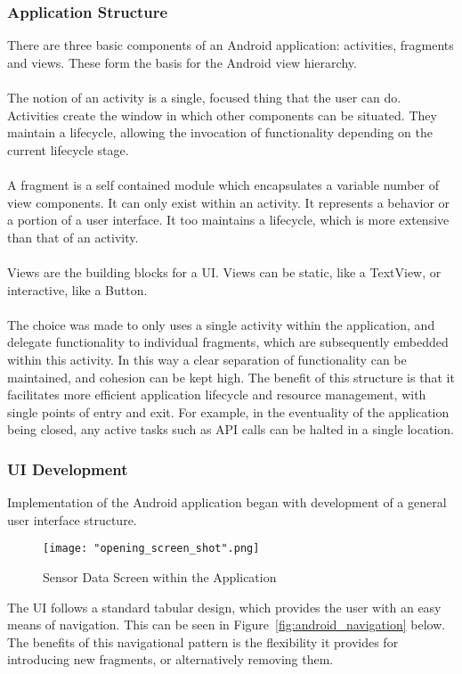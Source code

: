 \documentclass{article}
\begin{document}
\subsubsection{Application Structure}
There are three basic components of an Android application: activities, fragments and views. These form the basis for the Android view hierarchy. \\\\
The notion of an activity is a single, focused thing that the user can do. Activities create the window in which other components can be situated. They maintain a lifecycle, allowing the invocation of functionality depending on the current lifecycle stage. \\\\
A fragment is a self contained module which encapsulates a variable number of view components. It can only exist within an activity. It represents a behavior or a portion of a user interface. It too maintains a lifecycle, which is more extensive than that of an activity.\\\\
Views are the building blocks for a UI. Views can be static, like a TextView, or interactive, like a Button. \\\\
The choice was made to only uses a single activity within the application, and delegate functionality to individual fragments, which are subsequently embedded within this activity. In this way a clear separation of functionality can be maintained, and cohesion can be kept high. The benefit of this structure is that it facilitates more efficient application lifecycle and resource management, with single points of entry and exit. For example, in the eventuality of the application being closed, any active tasks such as API calls can be halted in a single location. 

\subsubsection{UI Development}
Implementation of the Android application began with development of a general user interface structure.

\begin{figure}[H]
\centering
\texttt{[image: "opening\_screen\_shot".png]}
\caption{Sensor Data Screen within the Application}
\label{fig:android_opening_screen}
\end{figure}

\noindent
The UI follows a standard tabular design, which provides the user with an easy means of navigation. This can be seen in Figure~\ref{fig:android_navigation} below. The benefits of this navigational pattern is the flexibility it provides for introducing new fragments, or alternatively removing them.
\end{document}
